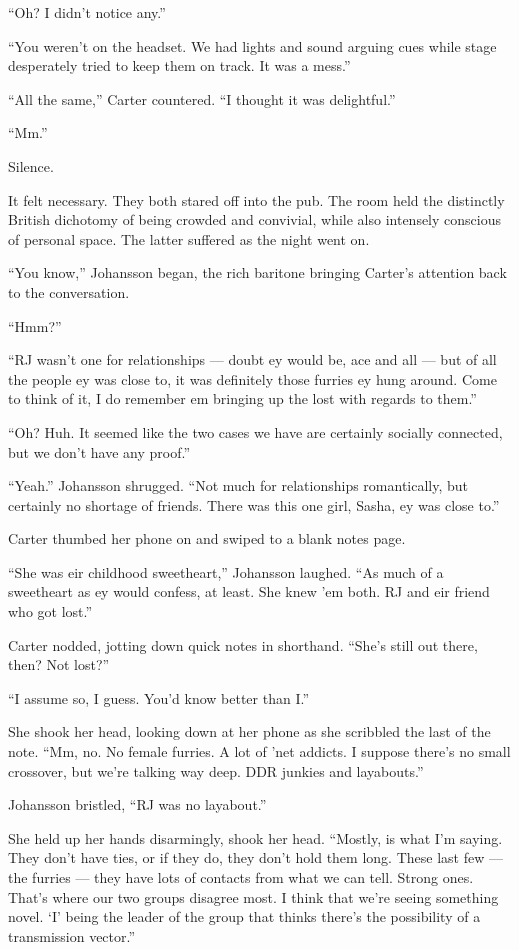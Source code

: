 ``Oh? I didn't notice any.''

``You weren't on the headset. We had lights and sound arguing cues while stage desperately tried to keep them on track. It was a mess.''

``All the same,'' Carter countered. ``I thought it was delightful.''

``Mm.''

Silence.

It felt necessary. They both stared off into the pub. The room held the distinctly British dichotomy of being crowded and convivial, while also intensely conscious of personal space. The latter suffered as the night went on.

``You know,'' Johansson began, the rich baritone bringing Carter's attention back to the conversation.

``Hmm?''

``RJ wasn't one for relationships — doubt ey would be, ace and all — but of all the people ey was close to, it was definitely those furries ey hung around. Come to think of it, I do remember em bringing up the lost with regards to them.''

``Oh? Huh. It seemed like the two cases we have are certainly socially connected, but we don't have any proof.''

``Yeah.'' Johansson shrugged. ``Not much for relationships romantically, but certainly no shortage of friends. There was this one girl, Sasha, ey was close to.''

Carter thumbed her phone on and swiped to a blank notes page.

``She was eir childhood sweetheart,'' Johansson laughed. ``As much of a sweetheart as ey would confess, at least. She knew 'em both. RJ and eir friend who got lost.''

Carter nodded, jotting down quick notes in shorthand. ``She's still out there, then? Not lost?''

``I assume so, I guess. You'd know better than I.''

She shook her head, looking down at her phone as she scribbled the last of the note. ``Mm, no. No female furries. A lot of 'net addicts. I suppose there's no small crossover, but we're talking way deep. DDR junkies and layabouts.''

Johansson bristled, ``RJ was no layabout.''

She held up her hands disarmingly, shook her head. ``Mostly, is what I'm saying. They don't have ties, or if they do, they don't hold them long. These last few — the furries — they have lots of contacts from what we can tell. Strong ones. That's where our two groups disagree most. I think that we're seeing something novel. `I' being the leader of the group that thinks there's the possibility of a transmission vector.''

